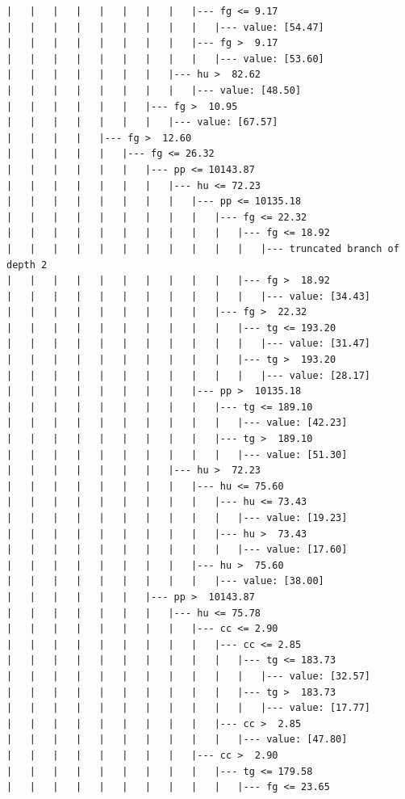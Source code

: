 \documentclass[UTF8, a4paper]{ctexart}
\begin{document}
\begin{lstlisting}
|   |   |   |   |   |   |   |   |--- fg <= 9.17
|   |   |   |   |   |   |   |   |   |--- value: [54.47]
|   |   |   |   |   |   |   |   |--- fg >  9.17
|   |   |   |   |   |   |   |   |   |--- value: [53.60]
|   |   |   |   |   |   |   |--- hu >  82.62
|   |   |   |   |   |   |   |   |--- value: [48.50]
|   |   |   |   |   |   |--- fg >  10.95
|   |   |   |   |   |   |   |--- value: [67.57]
|   |   |   |   |--- fg >  12.60
|   |   |   |   |   |--- fg <= 26.32
|   |   |   |   |   |   |--- pp <= 10143.87
|   |   |   |   |   |   |   |--- hu <= 72.23
|   |   |   |   |   |   |   |   |--- pp <= 10135.18
|   |   |   |   |   |   |   |   |   |--- fg <= 22.32
|   |   |   |   |   |   |   |   |   |   |--- fg <= 18.92
|   |   |   |   |   |   |   |   |   |   |   |--- truncated branch of depth 2
|   |   |   |   |   |   |   |   |   |   |--- fg >  18.92
|   |   |   |   |   |   |   |   |   |   |   |--- value: [34.43]
|   |   |   |   |   |   |   |   |   |--- fg >  22.32
|   |   |   |   |   |   |   |   |   |   |--- tg <= 193.20
|   |   |   |   |   |   |   |   |   |   |   |--- value: [31.47]
|   |   |   |   |   |   |   |   |   |   |--- tg >  193.20
|   |   |   |   |   |   |   |   |   |   |   |--- value: [28.17]
|   |   |   |   |   |   |   |   |--- pp >  10135.18
|   |   |   |   |   |   |   |   |   |--- tg <= 189.10
|   |   |   |   |   |   |   |   |   |   |--- value: [42.23]
|   |   |   |   |   |   |   |   |   |--- tg >  189.10
|   |   |   |   |   |   |   |   |   |   |--- value: [51.30]
|   |   |   |   |   |   |   |--- hu >  72.23
|   |   |   |   |   |   |   |   |--- hu <= 75.60
|   |   |   |   |   |   |   |   |   |--- hu <= 73.43
|   |   |   |   |   |   |   |   |   |   |--- value: [19.23]
|   |   |   |   |   |   |   |   |   |--- hu >  73.43
|   |   |   |   |   |   |   |   |   |   |--- value: [17.60]
|   |   |   |   |   |   |   |   |--- hu >  75.60
|   |   |   |   |   |   |   |   |   |--- value: [38.00]
|   |   |   |   |   |   |--- pp >  10143.87
|   |   |   |   |   |   |   |--- hu <= 75.78
|   |   |   |   |   |   |   |   |--- cc <= 2.90
|   |   |   |   |   |   |   |   |   |--- cc <= 2.85
|   |   |   |   |   |   |   |   |   |   |--- tg <= 183.73
|   |   |   |   |   |   |   |   |   |   |   |--- value: [32.57]
|   |   |   |   |   |   |   |   |   |   |--- tg >  183.73
|   |   |   |   |   |   |   |   |   |   |   |--- value: [17.77]
|   |   |   |   |   |   |   |   |   |--- cc >  2.85
|   |   |   |   |   |   |   |   |   |   |--- value: [47.80]
|   |   |   |   |   |   |   |   |--- cc >  2.90
|   |   |   |   |   |   |   |   |   |--- tg <= 179.58
|   |   |   |   |   |   |   |   |   |   |--- fg <= 23.65

\end{lstlisting}
\end{document}
